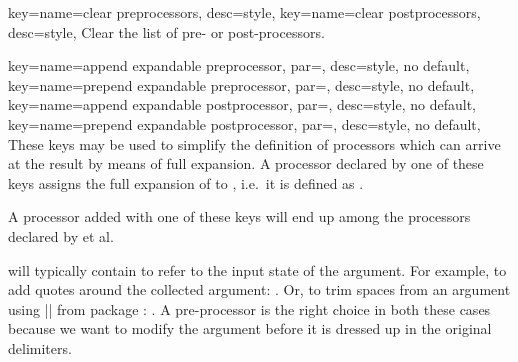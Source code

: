 \documentclass[a4paper,11pt]{article}
\begin{document}
\begin{doc}[
    pi={\docaux{cmd}{collargsClearPreprocessors},
      \docaux{cmd}{collargsClearPostprocessors}},
  ]{
    key={name=clear preprocessors}, desc=style,
    key={name=clear postprocessors}, desc=style,
  }
  Clear the list of pre- or post-processors.
\end{doc}

\begin{doc}[
    pi={\docaux{cmd}{collargsAppendExpandablePreprocessor},
      \docaux{cmd}{collargsPrependExpandablePreprocessor},
      \docaux{cmd}{collargsAppendExpandablePostprocessor},
      \docaux{cmd}{collargsPrependExpandablePostprocessor}
    },
  ]{
    key={name=append expandable preprocessor, par=, desc={style, no default}},
    key={name=prepend expandable preprocessor, par=, desc={style, no default}},
    key={name=append expandable postprocessor, par=, desc={style, no default}},
    key={name=prepend expandable postprocessor, par=, desc={style, no default}},
  }
  These keys may be used to simplify the definition of processors which can
  arrive at the result by means of full expansion.  A processor declared by one
  of these keys assigns the full expansion of  to
  , i.e.\ it is defined as
  .

  A processor added with one of these keys will end up among the processors
  declared by  et al.

   will typically contain  to
  refer to the input state of the argument.  For example, to add quotes around
  the collected argument: .  Or, to trim spaces from an
  argument using |\trim@spaces@noexp| from package :
  .  A pre-processor is the
  right choice in both these cases because we want to modify the argument
  before it is dressed up in the original delimiters.


\end{doc}
\end{document}
